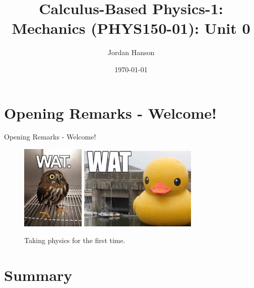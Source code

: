 \documentclass{beamer}
\title{Calculus-Based Physics-1: Mechanics (PHYS150-01): Unit 0}
\date{\today}
\author{Jordan Hanson}
\institute{Whittier College Department of Physics and Astronomy}
\begin{document}
\maketitle

\section{Opening Remarks - Welcome!}

\begin{frame}{Opening Remarks - Welcome!}
\small
\begin{figure}
\centering
\includegraphics[width=0.27\textwidth]{../../watowl.jpeg}
\includegraphics[width=0.5\textwidth]{../../watTheDuck.png}
\caption{\label{fig:wat1} Taking physics for the first time.}
\end{figure}
\end{frame}

\section{Summary}
\end{document}
